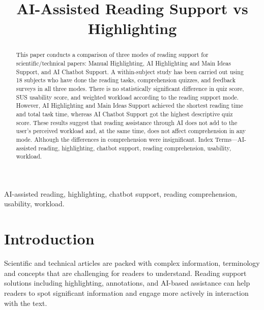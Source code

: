 \documentclass{IEEEtran}
\begin{document}
\raggedbottom

\title{AI-Assisted Reading Support vs Highlighting}

\author{

}

\maketitle

\begin{abstract}
This paper conducts a comparison of three modes of
reading support for scientific/technical papers: Manual Highlighting, AI Highlighting and Main Ideas Support, and AI Chatbot
Support. A within-subject study has been carried out using 18 subjects who have done the reading tasks, comprehension quizzes, and
feedback surveys in all three modes. There is no statistically significant difference in quiz score, SUS usability score, and weighted
workload according to the reading support mode. However, AI
Highlighting and Main Ideas Support achieved the shortest reading time and total task time, whereas AI Chatbot Support got the
highest descriptive quiz score. These results suggest that reading assistance through AI does not add to the user’s perceived workload and, at the same time, does not affect comprehension in any mode. Although the differences in comprehension were insignificant.
Index Terms—AI-assisted reading, highlighting, chatbot support, reading comprehension, usability, workload.
\end{abstract}

\begin{IEEEkeywords}
AI-assisted reading, highlighting, chatbot support, reading comprehension, usability, workload.
\end{IEEEkeywords}

\thispagestyle{plain}
\pagestyle{plain}


\section{Introduction}

Scientific and technical articles are packed with complex information, terminology and concepts that are challenging for readers to understand. Reading support solutions including highlighting, annotations, and AI-based assistance can help readers to spot significant information and engage more actively in interaction with the text.
\end{document}
